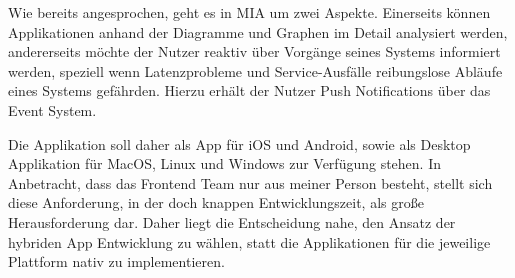 Wie bereits angesprochen, geht es in MIA um zwei Aspekte. Einerseits können Applikationen anhand der Diagramme und Graphen im Detail analysiert werden,
andererseits möchte der Nutzer reaktiv über Vorgänge seines Systems informiert werden, speziell wenn Latenzprobleme und Service-Ausfälle reibungslose Abläufe eines Systems gefährden.
Hierzu erhält der Nutzer Push Notifications über das Event System.

Die Applikation soll daher als App für iOS und Android, sowie als Desktop Applikation für MacOS, Linux und Windows zur Verfügung stehen.
In Anbetracht, dass das Frontend Team nur aus meiner Person besteht, stellt sich diese Anforderung, in der doch knappen Entwicklungszeit, als große Herausforderung dar.
Daher liegt die Entscheidung nahe, den Ansatz der hybriden App Entwicklung zu wählen, statt die Applikationen für die jeweilige Plattform nativ zu implementieren.
